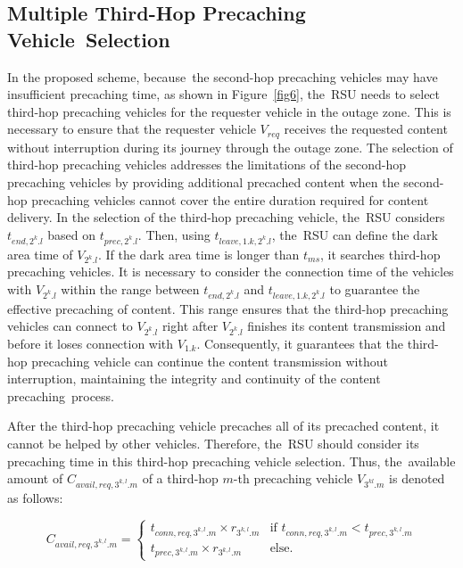 \documentclass[electronics,aricle,accept,pdftex,moreauthors]{Definitions/mdpi}
\begin{document}
\subsection{Multiple Third-Hop Precaching Vehicle~Selection} \label{sec3.5}


In the proposed scheme, because~the second-hop precaching vehicles may have insufficient precaching time, as shown in Figure~\ref{fig6}, the~RSU needs to select third-hop precaching vehicles for the requester vehicle in the outage zone.
This is necessary to ensure that the requester vehicle $V_{req}$ receives the requested content without interruption during its journey through the outage zone.
The selection of third-hop precaching vehicles addresses the limitations of the second-hop precaching vehicles by providing additional precached content when the second-hop precaching vehicles cannot cover the entire duration required for content delivery.
In the selection of the third-hop precaching vehicle, the~RSU considers $t_{end,2^{k}.l}$ based on $t_{prec,2^{k}.l}$.
Then, using $t_{leave,1.k,2^{k}.l}$, the~RSU can define the dark area time of $V_{2^{k}.l}$.
If the dark area time is longer than $t_{ms}$, it searches third-hop precaching vehicles.
It is necessary to consider the connection time of the vehicles with $V_{2^{k}.l}$ within the range between $t_{end,2^{k}.l}$ and $t_{leave,1.k,2^{k}.l}$ to guarantee the effective precaching of content. 
This range ensures that the third-hop precaching vehicles can connect to $V_{2^{k}.l}$ right after $V_{2^{k}.l}$ finishes its content transmission and before it loses connection with $V_{1.k}$.
Consequently, it guarantees that the third-hop precaching vehicle can continue the content transmission without interruption, maintaining the integrity and continuity of the content precaching~process.





After the third-hop precaching vehicle precaches all of its precached content, it cannot be helped by other vehicles.
Therefore, the~RSU should consider its precaching time in this third-hop precaching vehicle selection.
Thus, the~available amount of $C_{avail,req,3^{k,l}.m}$ of a third-hop $m$-th precaching vehicle $V_{3^{kl}.m}$ is denoted as follows:

\begin{equation}
    C_{avail,req,3^{k,l}.m}=\begin{cases}
        t_{conn,req,3^{k,l}.m}\times r_{3^{k,l}.m} & 
                \text{if }t_{conn,req,3^{k,l}.m} < t_{prec,3^{k,l}.m}\\
        t_{prec,3^{k,l}.m}\times r_{3^{k,l}.m} & 
                \text{else.}
    \end{cases}
\end{equation}
\end{document}
